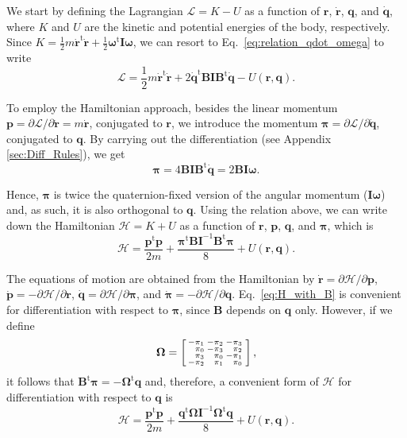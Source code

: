 \documentclass[aip,jcp,reprint,amsmath,amssymb]{revtex4-1}
\makeatletter
\newcommand{\mt}[1]{\boldsymbol{\mathbf{#1}}}           %
\newcommand{\vt}[1]{\boldsymbol{\mathbf{#1}}}           %
\newcommand{\tr}[1]{#1^\text{t}}                        %
\newenvironment{smallarray}[1]                          %
{\null\,\vcenter\bgroup\scriptsize
	\renewcommand{\arraystretch}{0.7}
	\arraycolsep=.13885em
	\hbox\bgroup$\array{@{}#1@{}}}
{\endarray$\egroup\egroup\,\null}
\makeatother
\begin{document}
We start by defining the Lagrangian $\mathcal{L} = K - U$ as a function of $\vt r$, $\dot{\vt r}$, $\vt q$, and $\dot{\vt q}$, where $K$ and $U$ are the kinetic and potential energies of the body, respectively. Since $K = \frac{1}{2} m \tr{\dot{\vt r}} \dot{\vt r} + \frac{1}{2} \tr{\vt \omega} \mt I \vt \omega$,\cite{Goldstein2002} we can resort to Eq.~\ref{eq:relation_qdot_omega} to write
\[
\mathcal{L} = \frac{1}{2} m \tr{\dot{\vt r}} \dot{\vt r} + 2 \tr{\dot{\vt q}} \mt B \mt I \tr{\mt B} \dot{\vt q} - U(\vt r, \vt q).
\]

To employ the Hamiltonian approach, besides the linear momentum $\vt p = \partial \mathcal{L}/\partial \dot{\vt r} = m \dot{\vt r}$, conjugated to $\vt r$, we introduce the momentum $\vt \pi = \partial \mathcal{L}/\partial \dot{\vt q}$, conjugated to $\vt q$.\cite{Goldstein2002} By carrying out the differentiation (see Appendix \ref{sec:Diff_Rules}), we get
\begin{equation}
\label{eq:conj_momentum}
\vt \pi = 4 \mt B \mt I \tr{\mt B} \dot{\vt q} = 2 \mt B \mt I \vt \omega.
\end{equation}

Hence, $\vt \pi$ is twice the quaternion-fixed version of the angular momentum ($\mt I \vt \omega$) and, as such, it is also orthogonal to $\vt q$. Using the relation above, we can write down the Hamiltonian $\mathcal{H} = K + U$ as a function of $\vt r$, $\vt p$, $\vt q$, and $\vt \pi$, which is
\begin{equation}
\label{eq:H_with_B}
\mathcal{H} = \frac{\tr{\vt p} \vt p}{2m} + \frac{\tr{\vt \pi} {\mt B} {\mt I}^{-1} \tr{\mt B} \vt \pi}{8} + U(\vt r, \vt q).
\end{equation}

The equations of motion are obtained from the Hamiltonian by $\dot{\vt r} = \partial \mathcal{H} / \partial \vt p$, $\dot{\vt p} = -\partial \mathcal{H} / \partial \vt r$, $\dot{\vt q} = \partial \mathcal{H} / \partial \vt \pi$, and $\dot{\vt \pi} = -\partial \mathcal{H} / \partial \vt q$.\cite{Goldstein2002} Eq.~\ref{eq:H_with_B} is convenient for differentiation with respect to $\vt \pi$, since $\mt B$ depends on $\vt q$ only. However, if we define
\[
\mt \Omega = \left[
\begin{smallarray}{rrrr}
-\pi_1 & -\pi_2 & -\pi_3 \\
 \pi_0 & -\pi_3 &  \pi_2 \\
 \pi_3 &  \pi_0 & -\pi_1 \\
-\pi_2 &  \pi_1 &  \pi_0
\end{smallarray}
\right],
\]
it follows that $\tr{\mt B}{\vt \pi} = - \tr{\mt \Omega}{\vt q}$ and, therefore, a convenient form of $\mathcal{H}$ for differentiation with respect to $\vt q$ is
\begin{equation}
\label{eq:H_with_Omega}
\mathcal{H} = \frac{\tr{\vt p} \vt p}{2m} + \frac{\tr{\vt q} {\mt \Omega} {\mt I}^{-1} \tr{\mt \Omega} \vt q}{8} + U(\vt r, \vt q).
\end{equation}
\end{document}
